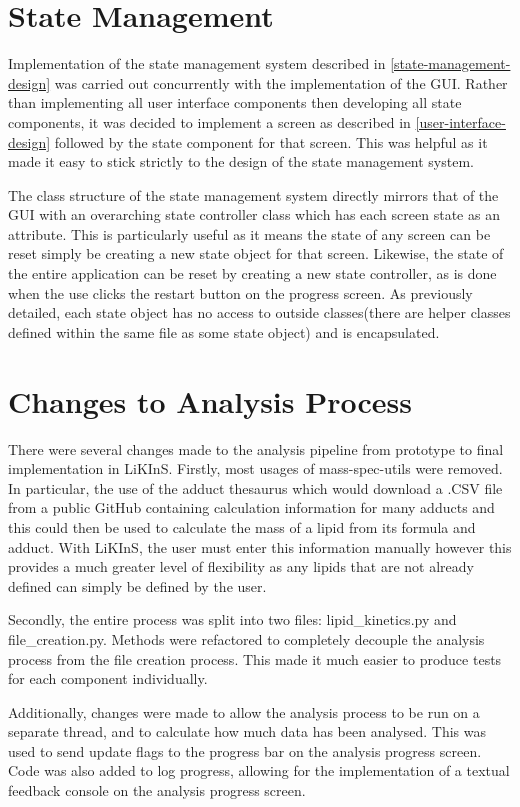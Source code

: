 \documentclass{l4proj}
\begin{document}
\section{State Management} \label{state-management-implementation}
Implementation of the state management system described in \ref{state-management-design} was carried out concurrently with the implementation of the GUI. Rather than implementing all user interface components then developing all state components, it was decided to implement a screen as described in \ref{user-interface-design} followed by the state component for that screen. This was helpful as it made it easy to stick strictly to the design of the state management system.

The class structure of the state management system directly mirrors that of the GUI with an overarching state controller class which has each screen state as an attribute. This is particularly useful as it means the state of any screen can be reset simply be creating a new state object for that screen. Likewise, the state of the entire application can be reset by creating a new state controller, as is done when the use clicks the restart button on the progress screen. As previously detailed, each state object has no access to outside classes(there are helper classes defined within the same file as some state object) and is encapsulated.

\section{Changes to Analysis Process}
There were several changes made to the analysis pipeline from prototype to final implementation in LiKInS. Firstly, most usages of mass-spec-utils were removed. In particular, the use of the adduct thesaurus which would download a .CSV file from a public GitHub containing calculation information for many adducts and this could then be used to calculate the mass of a lipid from its formula and adduct. With LiKInS, the user must enter this information manually however this provides a much greater level of flexibility as any lipids that are not already defined can simply be defined by the user.

Secondly, the entire process was split into two files: lipid\_kinetics.py and file\_creation.py. Methods were refactored to completely decouple the analysis process from the file creation process. This made it much easier to produce tests for each component individually.

Additionally, changes were made to allow the analysis process to be run on a separate thread, and to calculate how much data has been analysed. This was used to send update flags to the progress bar on the analysis progress screen. Code was also added to log progress, allowing for the implementation of a textual feedback console on the analysis progress screen.
\end{document}
